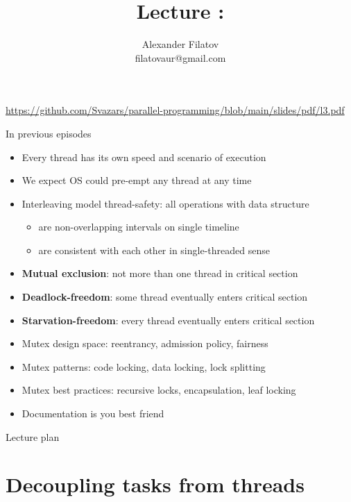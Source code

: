 


\title[]{Lecture \basicTwoNum: \basicTwoTopic}
\subtitle[]{\basicTwoKey}
\author[]{Alexander Filatov\\ filatovaur@gmail.com}

\date{}



\begin{frame}
  \titlepage
    \url{https://github.com/Svazars/parallel-programming/blob/main/slides/pdf/l3.pdf}
\end{frame}

\begin{frame}{In previous episodes}

\begin{itemize} 
 \item Every thread has its own speed and scenario of execution
 \item We expect OS could pre-empt any thread at any time
 \item Interleaving model thread-safety: all operations with data structure 
 \begin{itemize} 
    \item are non-overlapping intervals on single timeline
    \item are consistent with each other in single-threaded sense
 \end{itemize} 
 \item \textbf{Mutual exclusion}: not more than one thread in critical section
 \item \textbf{Deadlock-freedom}: some thread eventually enters critical section
 \item \textbf{Starvation-freedom}: every thread eventually enters critical section
 \item Mutex design space: reentrancy, admission policy, fairness 
 \item Mutex patterns: code locking, data locking, lock splitting
 \item Mutex best practices: recursive locks, encapsulation, leaf locking
 \item Documentation is you best friend
 \end{itemize}
\end{frame}

\begin{frame}{Lecture plan}
\tableofcontents
\end{frame}

\section{Decoupling tasks from threads}
